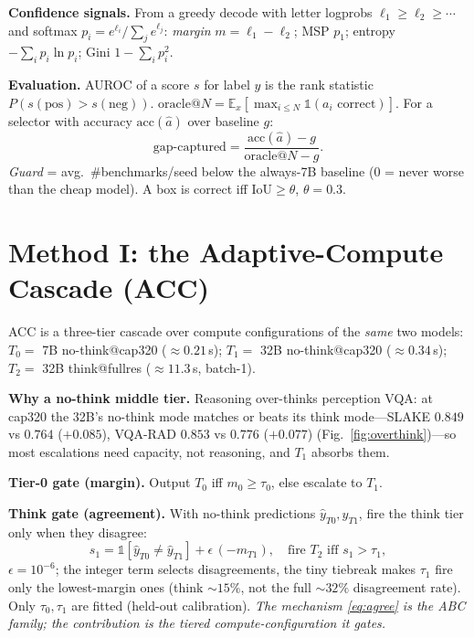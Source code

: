 \documentclass[conference]{IEEEtran}
\begin{document}
\textbf{Confidence signals.} From a greedy decode with letter logprobs $\ell_1{\ge}\ell_2{\ge}\cdots$ and softmax $p_i=e^{\ell_i}/\sum_j e^{\ell_j}$: \emph{margin} $m=\ell_1-\ell_2$; MSP $p_1$; entropy $-\sum_i p_i\ln p_i$; Gini $1-\sum_i p_i^2$.

\textbf{Evaluation.} AUROC of a score $s$ for label $y$ is the rank statistic $P\!\left(s(\text{pos}){>}s(\text{neg})\right)$. $\mathrm{oracle}@N=\mathbb{E}_x[\max_{i\le N}\mathbb{1}(a_i\text{ correct})]$. For a selector with accuracy $\mathrm{acc}(\hat a)$ over baseline $g$:
\begin{equation}
\text{gap-captured} = \frac{\mathrm{acc}(\hat a)-g}{\mathrm{oracle}@N - g}. \label{eq:gap}
\end{equation}
\emph{Guard} = avg.\ \#benchmarks/seed below the always-7B baseline (0 = never worse than the cheap model). A box is correct iff $\mathrm{IoU}\ge\theta$, $\theta{=}0.3$.

\section{Method I: the Adaptive-Compute Cascade (ACC)}
ACC is a three-tier cascade over compute configurations of the \emph{same} two models: $T_0=$ 7B no-think@cap320 (${\approx}0.21$\,s); $T_1=$ 32B no-think@cap320 (${\approx}0.34$\,s); $T_2=$ 32B think@fullres (${\approx}11.3$\,s, batch-1).

\textbf{Why a no-think middle tier.} Reasoning over-thinks perception VQA: at cap320 the 32B's no-think mode matches or beats its think mode---SLAKE $0.849$ vs $0.764$ ($+0.085$), VQA-RAD $0.853$ vs $0.776$ ($+0.077$) (Fig.~\ref{fig:overthink})---so most escalations need capacity, not reasoning, and $T_1$ absorbs them.

\textbf{Tier-0 gate (margin).} Output $T_0$ iff $m_0\ge\tau_0$, else escalate to $T_1$.

\textbf{Think gate (agreement).} With no-think predictions $\hat y_{T0},\hat y_{T1}$, fire the think tier only when they disagree:
\begin{equation}
s_1 = \mathbb{1}[\hat y_{T0}\neq\hat y_{T1}] + \epsilon\,(-m_{T1}),\quad \text{fire }T_2 \text{ iff } s_1>\tau_1, \label{eq:agree}
\end{equation}
$\epsilon{=}10^{-6}$; the integer term selects disagreements, the tiny tiebreak makes $\tau_1$ fire only the lowest-margin ones (think ${\sim}15\%$, not the full ${\sim}32\%$ disagreement rate). Only $\tau_0,\tau_1$ are fitted (held-out calibration). \emph{The mechanism \eqref{eq:agree} is the ABC family; the contribution is the tiered compute-configuration it gates.}
\end{document}
